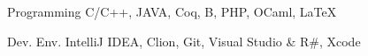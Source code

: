 

\begin{cvskills}

  \cvskill
    {Programming} %
    {C/C++, JAVA, Coq, B, PHP, OCaml, \LaTeX} %

  \cvskill
    {Dev. Env.} %
    {IntelliJ IDEA, Clion, Git, Visual Studio \& R\#, Xcode} %

\end{cvskills}

